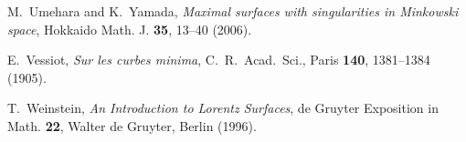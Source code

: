\documentclass[11pt,reqno]{amsart}
\theoremstyle{plain} %
\theoremstyle{definition}
\begin{document}
\begin{thebibliography}{99}
M.~Umehara and K.~Yamada,
\emph{Maximal surfaces with singularities in Minkowski space}, Hokkaido Math. J. {\bf 35}, 13--40 (2006).

E.~Vessiot,
\emph{Sur les curbes minima}, C.\ R.\ Acad.\ Sci., Paris {\bf 140}, 1381--1384 (1905).

T.~Weinstein, 
\emph{An Introduction to Lorentz Surfaces}, de Gruyter Exposition in Math. {\bf 22}, Walter de Gruyter, Berlin (1996).

\end{thebibliography}


 
\end{document}
